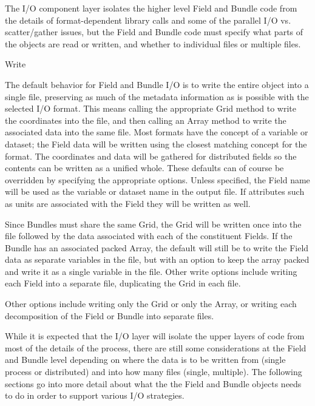The I/O component layer isolates the higher level Field
and Bundle
code from the details of format-dependent library calls
and some of the parallel I/O vs. scatter/gather issues, 
but the Field and Bundle code must specify 
what parts of the objects are read or written, and
whether to individual files or multiple files.  


\begin{description}

\item{Write}

The default behavior for Field and Bundle I/O
is to write the entire object into a single file,
preserving as much of the metadata information as is
possible with the selected I/O format.  This means
calling the appropriate Grid method to write the coordinates
into the file, and then calling an Array method to
write the associated data into the same file.  
Most formats have the concept of a variable or dataset;
the Field data will be written using the closest matching
concept for the format.  The coordinates and data will
be gathered for distributed fields so the contents can
be written as a unified whole.  These defaults can of
course be overridden by specifying the appropriate options.
Unless specified, the Field name will be used as the
variable or dataset name in the output file.
If attributes such as units are associated with the
Field they will be written as well.  

Since Bundles must share the same Grid, the Grid
will be written once into the file followed by the
data associated with each of the constituent Fields.
If the Bundle has an associated packed Array, the
default will still be to write the Field data as separate
variables in the file, but with an option to keep the
array packed and write it as a single variable in the file.
Other write options include writing each Field into a
separate file, duplicating the Grid in each file.

Other options include writing only the Grid or only the
Array, or writing each decomposition of the Field
or Bundle into separate files.

While it is expected that the I/O layer will isolate the
upper layers of code from most of the details of the
process, there are still some considerations at the
Field and Bundle level depending on 
where the data
is to be written from (single process or distributed) and into
how many files (single, multiple).
The following sections go into more detail about what the
the Field and Bundle objects needs to do in order to 
support various I/O strategies.


\end{description}
